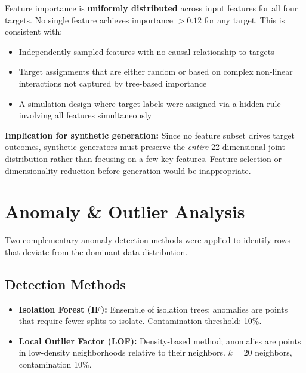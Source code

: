 \documentclass[11pt, a4paper]{report}
\begin{document}
\begin{findingbox}
Feature importance is \textbf{uniformly distributed} across input features for all four targets. No single feature achieves importance $> 0.12$ for any target. This is consistent with:
\begin{itemize}[nosep]
\item Independently sampled features with no causal relationship to targets
\item Target assignments that are either random or based on complex non-linear interactions not captured by tree-based importance
\item A simulation design where target labels were assigned via a hidden rule involving all features simultaneously
\end{itemize}
\end{findingbox}

\begin{warningbox}
\textbf{Implication for synthetic generation:} Since no feature subset drives target outcomes, synthetic generators must preserve the \emph{entire} 22-dimensional joint distribution rather than focusing on a few key features. Feature selection or dimensionality reduction before generation would be inappropriate.
\end{warningbox}


\chapter{Anomaly \& Outlier Analysis}

Two complementary anomaly detection methods were applied to identify rows that deviate from the dominant data distribution.

\section{Detection Methods}

\begin{itemize}[nosep]
\item \textbf{Isolation Forest (IF):} Ensemble of isolation trees; anomalies are points that require fewer splits to isolate. Contamination threshold: 10\%.
\item \textbf{Local Outlier Factor (LOF):} Density-based method; anomalies are points in low-density neighborhoods relative to their neighbors. $k=20$ neighbors, contamination 10\%.
\end{itemize}
\end{document}
